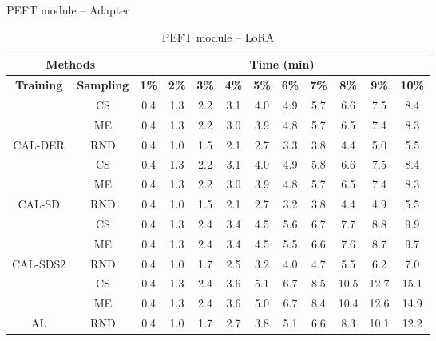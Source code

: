 \begin{table}[htbp]
\centering
\begin{subtable}{\linewidth}
\centering
\caption{PEFT module -- Adapter}

\begin{tabular}{c|c|cccccccccc}
\toprule
\multicolumn{2}{c|}{\textbf{Methods}} & \multicolumn{10}{c}{\textbf{Time (min)}} \\
\midrule
\textbf{Training} & \textbf{Sampling} & \textbf{1\%} & \textbf{2\%} & \textbf{3\%} & \textbf{4\%} & \textbf{5\%} & \textbf{6\%} & \textbf{7\%} & \textbf{8\%} & \textbf{9\%} & \textbf{10\%}\\
\midrule
 & CS & 0.4 & 1.3 & 2.2 & 3.1 & 4.0 & 4.9 & 5.7 & 6.6 & 7.5 & 8.4\\

 & ME & 0.4 & 1.3 & 2.2 & 3.0 & 3.9 & 4.8 & 5.7 & 6.5 & 7.4 & 8.3\\

\multirow{-3}{*}{\raggedright\arraybackslash CAL-DER} & RND & 0.4 & 1.0 & 1.5 & 2.1 & 2.7 & 3.3 & 3.8 & 4.4 & 5.0 & 5.5\\
\midrule
 & CS & 0.4 & 1.3 & 2.2 & 3.1 & 4.0 & 4.9 & 5.8 & 6.6 & 7.5 & 8.4\\

 & ME & 0.4 & 1.3 & 2.2 & 3.0 & 3.9 & 4.8 & 5.7 & 6.5 & 7.4 & 8.3\\

\multirow{-3}{*}{\raggedright\arraybackslash CAL-SD} & RND & 0.4 & 1.0 & 1.5 & 2.1 & 2.7 & 3.2 & 3.8 & 4.4 & 4.9 & 5.5\\
\midrule
 & CS & 0.4 & 1.3 & 2.4 & 3.4 & 4.5 & 5.6 & 6.7 & 7.7 & 8.8 & 9.9\\

 & ME & 0.4 & 1.3 & 2.4 & 3.4 & 4.5 & 5.5 & 6.6 & 7.6 & 8.7 & 9.7\\

\multirow{-3}{*}{\raggedright\arraybackslash CAL-SDS2} & RND & 0.4 & 1.0 & 1.7 & 2.5 & 3.2 & 4.0 & 4.7 & 5.5 & 6.2 & 7.0\\
\midrule
 & CS & 0.4 & 1.3 & 2.4 & 3.6 & 5.1 & 6.7 & 8.5 & 10.5 & 12.7 & 15.1\\

 & ME & 0.4 & 1.3 & 2.4 & 3.6 & 5.0 & 6.7 & 8.4 & 10.4 & 12.6 & 14.9\\

\multirow{-3}{*}{\raggedright\arraybackslash AL} & RND & 0.4 & 1.0 & 1.7 & 2.7 & 3.8 & 5.1 & 6.6 & 8.3 & 10.1 & 12.2\\
\bottomrule
\end{tabular}
\end{subtable}
\vspace{1em}
\begin{subtable}{\linewidth}
\centering
\caption{PEFT module -- LoRA}


\end{subtable}
\end{table}
